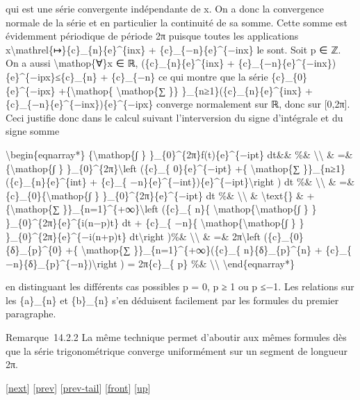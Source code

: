 \documentclass[]{article}
\begin{document}
qui est une série convergente indépendante de x. On a donc la
convergence normale de la série et en particulier la continuité de sa
somme. Cette somme est évidemment périodique de période 2π puisque
toutes les applications
x\textbackslash{}mathrel\{↦\}\{c\}\_\{n\}\{e\}\^{}\{inx\} +
\{c\}\_\{−n\}\{e\}\^{}\{−inx\} le sont. Soit p ∈ ℤ. On a aussi
\textbackslash{}mathop\{∀\}x ∈ ℝ,
\textbar{}(\{c\}\_\{n\}\{e\}\^{}\{inx\} +
\{c\}\_\{−n\}\{e\}\^{}\{−inx\})\{e\}\^{}\{−ipx\}\textbar{}≤\textbar{}\{c\}\_\{n\}\textbar{}
+ \textbar{}\{c\}\_\{−n\}\textbar{} ce qui montre que la série
\{c\}\_\{0\}\{e\}\^{}\{−ipx\} +\{\textbackslash{}mathop\{
\textbackslash{}mathop\{∑ \}\} \}\_\{n≥1\}(\{c\}\_\{n\}\{e\}\^{}\{inx\}
+ \{c\}\_\{−n\}\{e\}\^{}\{−inx\})\{e\}\^{}\{−ipx\} converge normalement
sur ℝ, donc sur {[}0,2π{]}. Ceci justifie donc dans le calcul suivant
l'interversion du signe d'intégrale et du signe somme

\textbackslash{}begin\{eqnarray*\} \{\textbackslash{}mathop\{∫ \}
\}\_\{0\}\^{}\{2π\}f(t)\{e\}\^{}\{−ipt\} dt\&\& \%\&
\textbackslash{}\textbackslash{} \& =\& \{\textbackslash{}mathop\{∫ \}
\}\_\{0\}\^{}\{2π\}\textbackslash{}left (\{c\}\_\{ 0\}\{e\}\^{}\{−ipt\}
+\{ \textbackslash{}mathop\{∑ \}\}\_\{n≥1\}(\{c\}\_\{n\}\{e\}\^{}\{int\}
+ \{c\}\_\{ −n\}\{e\}\^{}\{−int\})\{e\}\^{}\{−ipt\}\textbackslash{}right
) dt \%\& \textbackslash{}\textbackslash{} \& =\&
\{c\}\_\{0\}\{\textbackslash{}mathop\{∫ \}
\}\_\{0\}\^{}\{2π\}\{e\}\^{}\{−ipt\} dt \%\&
\textbackslash{}\textbackslash{} \& \textbackslash{}text\{\} \&
+\{\textbackslash{}mathop\{∑ \}\}\_\{n=1\}\^{}\{+∞\}\textbackslash{}left
(\{c\}\_\{ n\}\{ \textbackslash{}mathop\{\textbackslash{}mathop\{∫ \} \}
\}\_\{0\}\^{}\{2π\}\{e\}\^{}\{i(n−p)t\} dt + \{c\}\_\{ −n\}\{
\textbackslash{}mathop\{\textbackslash{}mathop\{∫ \} \}
\}\_\{0\}\^{}\{2π\}\{e\}\^{}\{−i(n+p)t\} dt\textbackslash{}right )\%\&
\textbackslash{}\textbackslash{} \& =\& 2π\textbackslash{}left
(\{c\}\_\{0\}\{δ\}\_\{p\}\^{}\{0\} +\{ \textbackslash{}mathop\{∑
\}\}\_\{n=1\}\^{}\{+∞\}(\{c\}\_\{ n\}\{δ\}\_\{p\}\^{}\{n\} + \{c\}\_\{
−n\}\{δ\}\_\{p\}\^{}\{−n\})\textbackslash{}right ) = 2π\{c\}\_\{ p\}
\%\& \textbackslash{}\textbackslash{} \textbackslash{}end\{eqnarray*\}

en distinguant les différents cas possibles p = 0, p ≥ 1 ou p ≤−1. Les
relations sur les \{a\}\_\{n\} et \{b\}\_\{n\} s'en déduisent facilement
par les formules du premier paragraphe.

Remarque~14.2.2 La même technique permet d'aboutir aux mêmes formules
dès que la série trigonométrique converge uniformément sur un segment de
longueur 2π.

{[}\href{coursse79.html}{next}{]} {[}\href{coursse77.html}{prev}{]}
{[}\href{coursse77.html\#tailcoursse77.html}{prev-tail}{]}
{[}\href{coursse78.html}{front}{]}
{[}\href{coursch15.html\#coursse78.html}{up}{]}
\end{document}
